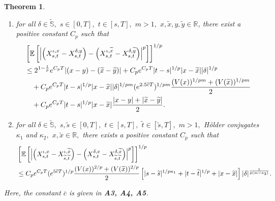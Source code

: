 \documentclass[11pt]{article}
\theoremstyle{theorem}
\newtheorem{Thm}[Def]{Theorem}
\theoremstyle{definition}
\newcommand{\bR}{\mathbb{R}}
\newcommand{\1}{{\bf 1}}
\begin{document}
\begin{Thm}
\begin{enumerate}
\begin{align*}
\left[\mathbb{E}\left[\left|\left(X^{\delta, x}_{s,\widetilde{t}}-X^{\delta,x}_{s,t}\right) - \left(X^{\delta, \widetilde{x}}_{s,\widetilde{t}}-X^{\delta, \widetilde{x}}_{s,t}\right)\right|^p\right]\right]^{1/p}  \le C_p |t-\widetilde{t}|^{1/p} |x-\widetilde{x}|.
    \end{align*} 
    \item [\textup{(iv)}] for all $\delta \in \widetilde{\mathbb{S}},$ $ s \in [0, T],$ $t\in [s, T],$ $m>1,$ $x, \widetilde{x}, y, \widetilde{y} \in \bR$, there exist a positive constant $C_p$ such that
   \begin{align*}
&\left[\mathbb{E}\left[\left|\left(X^{\iota, x}_{s,t}-X^{\delta,y}_{s,t}\right) - \left(X^{\iota, \widetilde{x}}_{s,t}-X^{\delta, \widetilde{y}}_{s,t}\right)\right|^p\right]\right]^{1/p} \notag\\
& \leq 2^{1-\frac{1}{p}} e^{C_p T} |(x-y)-(\widetilde{x}-\widetilde{y})|  + C_p e^{C_p T} |t-s|^{1/p} |x-\widetilde{x}| |\delta|^{1/p}  \notag\\
& \quad + C_p  e^{C_p T}  |t-s|^{1/p} |x-\widetilde{x}| |\delta|^{1/pm} (e^{2.5\overline{c}T})^{1/pm} \frac{  (V(x))^{1/pm}+(V(\widetilde{x}))^{1/pm}}{2}  \notag\\   
& \quad + C_p e^{C_p T}  |t-s|^{1/p} |x-\widetilde{x}|
\dfrac{|x-y|+ |\widetilde{x}-\widetilde{y}|}{2}.
\end{align*}
    \item [\textup{(v)}] for all $\delta \in \widetilde{\mathbb{S}},$ $ s, \widetilde{s} \in [0, T],$ $t\in [s, T],$ $\widetilde{t} \in [\widetilde{s}, T],$ $m>1,$ H\"older conjugates $\kappa_1$ and $\kappa_2,$ $ x, \widetilde{x} \in \bR,$ there exists a positive constant $C_p$ such that\begin{align*}
&\left[\mathbb{E}\left[\left|\left(X^{\iota, x}_{s,t}-X^{\iota,\widetilde{x}}_{\widetilde{s},\widetilde{t}}\right) - \left(X^{\delta, x}_{s,t}-X^{\delta, \widetilde{x}}_{\widetilde{s},\widetilde{t}}\right)\right|^p\right]\right]^{1/p} \notag\\
  & \leq  C_p e^{C_p T} (e^{5 \overline{c}T})^{1/p}         \frac{(V(x))^{2/p}+(V(\widetilde{x}))^{2/p}}{2} \left[  |s-\widetilde{s}|^{1/p\kappa_1} + |t-\widetilde{t}|^{1/p} +|x-\widetilde{x}| \right]  |\delta|^{\frac{1}{p(m \vee \kappa_2)}}. 
    \end{align*}
\end{enumerate}
Here, the constant $\overline{c}$ is given in {\bf A3, A4, A5}.
\end{Thm}
\end{document}
